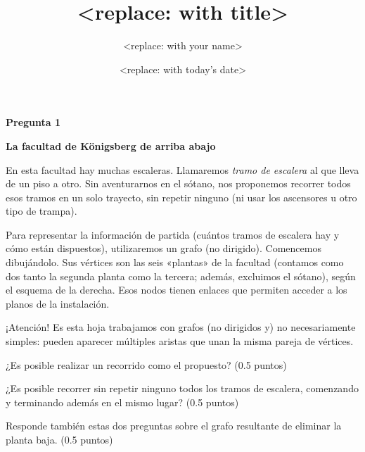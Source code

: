 
\author{<replace: with your name>}
\date{<replace: with today's date>}
\title{<replace: with title>}


\vspace{5mm}\centerline{\large\bf Pregunta 1}\vspace{5mm}
\label{sec:org13e6c29}
\centerline{\large\bf La facultad de Königsberg de arriba abajo}
\vspace{5mm}

En esta facultad hay muchas escaleras. Llamaremos
\emph{tramo de escalera} al que lleva de un piso a otro. Sin
aventurarnos en el sótano, nos proponemos  recorrer
  todos esos tramos en un solo trayecto, sin repetir
  ninguno (ni usar los ascensores u otro tipo de trampa).

\begin{minipage}{.7\textwidth}
Para representar la información de partida (cuántos tramos
de escalera hay y cómo están dispuestos), utilizaremos un
grafo (no dirigido). Comencemos dibujándolo. Sus vértices
son las seis «plantas» de la facultad (contamos como dos
tanto la segunda planta como la tercera; además, excluimos
el sótano), según el esquema de la derecha. Esos nodos
tienen enlaces que permiten acceder a los planos de la
instalación.


¡Atención! Es esta hoja trabajamos con grafos (no dirigidos
  y) no necesariamente simples: pueden aparecer
  múltiples aristas que unan la misma pareja de
  vértices.
\end{minipage}\hfill
\begin{minipage}{.2\textwidth}
\scaleto{$$}{4cm}
\end{minipage}\hfill

\prop
{¿Es posible realizar un recorrido como el propuesto? (0.5 puntos)}

\prop
{¿Es posible recorrer sin repetir ninguno todos los tramos
  de escalera, comenzando y terminando además en el mismo
  lugar? (0.5 puntos)}

\prop
{Responde también estas dos preguntas sobre el grafo
resultante de eliminar la planta baja. (0.5 puntos)}

